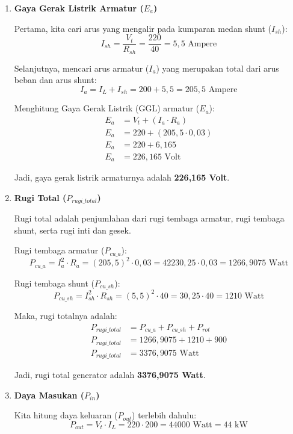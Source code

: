 \documentclass[12pt, a4paper]{article}
\begin{document}
\begin{enumerate}[label=\alph*.]
    \item \textbf{Gaya Gerak Listrik Armatur ($E_a$)}

    Pertama, kita cari arus yang mengalir pada kumparan medan shunt ($I_{sh}$):
    \[
        I_{sh} = \frac{V_t}{R_{sh}} = \frac{220}{40} = 5,5 \text{ Ampere}
    \]

    Selanjutnya, mencari arus armatur ($I_a$) yang merupakan total dari arus beban dan arus shunt:
    \[
        I_a = I_L + I_{sh} = 200 + 5,5 = 205,5 \text{ Ampere}
    \]

    Menghitung Gaya Gerak Listrik (GGL) armatur ($E_a$):
    \begin{align*}
        E_a &= V_t + (I_a \cdot R_a) \\
        E_a &= 220 + (205,5 \cdot 0,03) \\
        E_a &= 220 + 6,165 \\
        E_a &= 226,165 \text{ Volt}
    \end{align*}

    Jadi, gaya gerak listrik armaturnya adalah \textbf{226,165 Volt}.

    \item \textbf{Rugi Total ($P_{rugi\_total}$)}

    Rugi total adalah penjumlahan dari rugi tembaga armatur, rugi tembaga shunt, serta rugi inti dan gesek.

    Rugi tembaga armatur ($P_{cu\_a}$):
    \[
        P_{cu\_a} = I_a^2 \cdot R_a = (205,5)^2 \cdot 0,03 = 42230,25 \cdot 0,03 = 1266,9075 \text{ Watt}
    \]

    Rugi tembaga shunt ($P_{cu\_sh}$):
    \[
        P_{cu\_sh} = I_{sh}^2 \cdot R_{sh} = (5,5)^2 \cdot 40 = 30,25 \cdot 40 = 1210 \text{ Watt}
    \]

    Maka, rugi totalnya adalah:
    \begin{align*}
        P_{rugi\_total} &= P_{cu\_a} + P_{cu\_sh} + P_{rot} \\
        P_{rugi\_total} &= 1266,9075 + 1210 + 900 \\
        P_{rugi\_total} &= 3376,9075 \text{ Watt}
    \end{align*}

    Jadi, rugi total generator adalah \textbf{3376,9075 Watt}.

    \item \textbf{Daya Masukan ($P_{in}$)}

    Kita hitung daya keluaran ($P_{out}$) terlebih dahulu:
    \[
        P_{out} = V_t \cdot I_L = 220 \cdot 200 = 44000 \text{ Watt} = 44 \text{ kW}
    \]


\end{enumerate}
\end{document}
